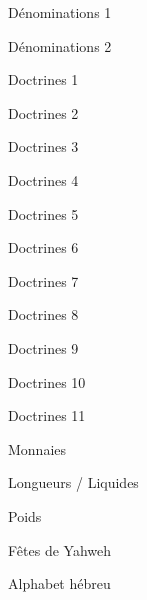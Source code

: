 \documentclass[10pt]{book}
\begin{document}
\begin{spacing}{0.8}
\clearpage
\begin{center}Dénominations 1\end{center}\clearpage
\begin{center}Dénominations 2\end{center}\clearpage
{}\clearpage
\begin{center}Doctrines 1\end{center}\clearpage
\begin{center}Doctrines 2\end{center}\clearpage
\begin{center}Doctrines 3\end{center}\clearpage
\begin{center}Doctrines 4\end{center}\clearpage
\begin{center}Doctrines 5\end{center}\clearpage
\begin{center}Doctrines 6\end{center}\clearpage
\begin{center}Doctrines 7\end{center}\clearpage
\begin{center}Doctrines 8\end{center}\clearpage
\begin{center}Doctrines 9\end{center}\clearpage
\begin{center}Doctrines 10\end{center}\clearpage
\begin{center}Doctrines 11\end{center}\clearpage
{}\clearpage
\begin{center}Monnaies\end{center}\clearpage
{}\clearpage
\begin{center}Longueurs / Liquides\end{center}\clearpage
{}\clearpage
\begin{center}Poids\end{center}\clearpage
{}\clearpage
\begin{center}Fêtes de Yahweh\end{center}\clearpage
{}\clearpage
\begin{center}Alphabet hébreu\end{center}\clearpage
\end{spacing}
\end{document}
